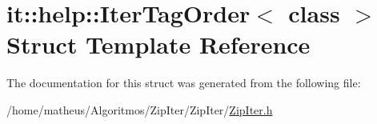 \hypertarget{structit_1_1help_1_1IterTagOrder}{}\section{it\+:\+:help\+:\+:Iter\+Tag\+Order$<$ class $>$ Struct Template Reference}
\label{structit_1_1help_1_1IterTagOrder}


The documentation for this struct was generated from the following file\+:\begin{DoxyCompactItemize}
\item 
/home/matheus/\+Algoritmos/\+Zip\+Iter/\+Zip\+Iter/\hyperlink{ZipIter_8h}{Zip\+Iter.\+h}\end{DoxyCompactItemize}
